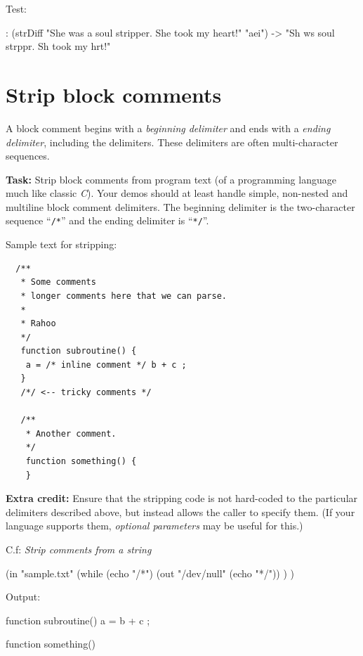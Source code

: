 \begin{itemize}
\begin{wideverbatim}
Test:

: (strDiff "She was a soul stripper. She took my heart!" "aei")
-> "Sh ws  soul strppr. Sh took my hrt!"

\end{wideverbatim}

\pagebreak{}
\section*{Strip block comments}

A block comment begins with a \emph{beginning delimiter} and ends with a
\emph{ending delimiter}, including the delimiters. These delimiters are
often multi-character sequences.

\textbf{Task:} Strip block comments from program text (of a programming
language much like classic \emph{C}). Your demos should at
least handle simple, non-nested and multiline block comment delimiters.
The beginning delimiter is the two-character sequence ``\texttt{/*}''
and the ending delimiter is ``\texttt{*/}''.

Sample text for stripping:

\begin{verbatim}
  /**
   * Some comments
   * longer comments here that we can parse.
   *
   * Rahoo 
   */
   function subroutine() {
    a = /* inline comment */ b + c ;
   }
   /*/ <-- tricky comments */

   /**
    * Another comment.
    */
    function something() {
    }
\end{verbatim}

\textbf{Extra credit:} Ensure that the stripping code is not
hard-coded to the particular delimiters described above, but instead
allows the caller to specify them. (If your language supports them,
\emph{optional parameters} may be useful for this.)

C.f: \emph{Strip comments from a string}


\begin{wideverbatim}

(in "sample.txt"
   (while (echo "/*")
      (out "/dev/null" (echo "*/")) ) )

Output:


   function subroutine() {
    a =  b + c ;
   }



    function something() {
    }

\end{wideverbatim}

\pagebreak{}

\end{itemize}
